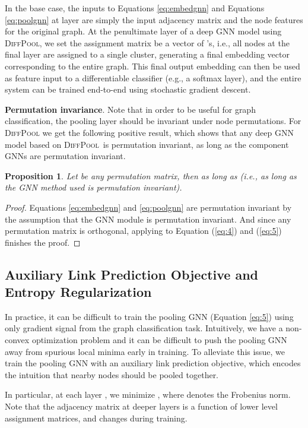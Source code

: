 \documentclass{article}
\newcommand{\xhdr}[1]{{\noindent\bfseries #1}.}
\newcommand{\name}{\textsc{DiffPool}\xspace}
\newcommand{\cut}[1]{}
\newtheorem{proposition}{Proposition}
\begin{document}
In the base case, the inputs to Equations \eqref{eq:embedgnn} and Equations \eqref{eq:poolgnn} at layer  are simply the input adjacency matrix  and the node features  for the original graph.
At the penultimate layer  of a deep GNN model using \name, we set the assignment matrix  be a vector of 's, i.e., all nodes at the final layer  are assigned to a single cluster, generating a final embedding vector corresponding to the entire graph.
This final output embedding can then be used as feature input to a differentiable classifier (e.g., a softmax layer), and the entire system can be trained end-to-end using stochastic gradient descent. 




\xhdr{Permutation invariance}
Note that in order to be useful for graph classification, the pooling layer should be invariant under node permutations. For \name we get the following positive result, which shows that any deep GNN model based on \name\ is permutation invariant, as long as the component GNNs are permutation invariant. 
\begin{proposition}
\label{prop:permute}
Let  be any permutation matrix, then  as long as  (i.e., as long as the GNN method used is permutation invariant).
\end{proposition}
\begin{proof}
Equations \eqref{eq:embedgnn} and \eqref{eq:poolgnn} are permutation invariant by the assumption that the GNN module is permutation invariant. 
And since any permutation matrix is orthogonal, applying  to Equation (\ref{eq:4}) and (\ref{eq:5}) finishes the proof.
\end{proof}


\subsection{Auxiliary Link Prediction Objective and Entropy Regularization}

In practice, it can be difficult to train the pooling GNN (Equation \ref{eq:5}) using only gradient signal from the graph classification task.
Intuitively, we have a non-convex optimization problem and it can be difficult to push the pooling GNN away from spurious local minima early in training.
To alleviate this issue, we train the pooling GNN with an auxiliary link prediction objective, which encodes the intuition that nearby nodes should be pooled together. 
\cut{
Controlling input features and representation dimension is still insufficient for  to learn and extract meaningful cluster information from a graph. We additionally supply side objectives as regularizations for . 
Intuitively,  should learn to assign nodes that are close together in terms of connectivity into the same clusters. 
Hence, we use a link prediction objective to further encourage similarity of cluster assignments.}
In particular, at each layer , we minimize
, where  denotes the Frobenius norm. 
Note that the adjacency matrix  at deeper layers is a function of lower level assignment matrices, and changes during training. 
\end{document}
